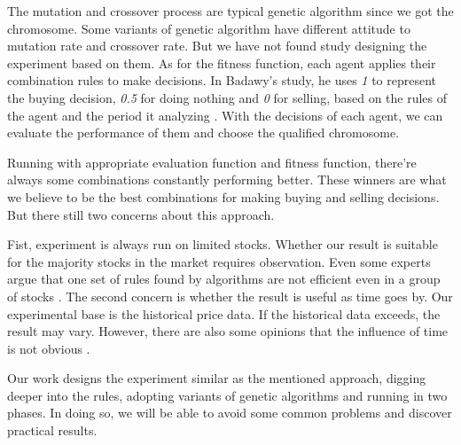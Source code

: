 \documentclass{article}
\begin{document}
The mutation and crossover process are typical genetic algorithm since we got the chromosome.
Some variants of genetic algorithm have different attitude to mutation rate and crossover rate.
But we have not found study designing the experiment based on them.
As for the fitness function, each agent applies their combination rules to make decisions.
In Badawy's study, he uses \emph{1} to represent the buying decision, \emph{0.5} for doing nothing and \emph{0} for selling,
based on the rules of the agent and the period it analyzing
\cite{genetic-algorithms-for-predicting-the-egyptian-stock-market}.
With the decisions of each agent, we can evaluate the performance of them and choose the qualified chromosome.

Running with appropriate evaluation function and fitness function,
there're always some combinations constantly performing better.
These winners are what we believe to be the best combinations for making buying and selling decisions.
But there still two concerns about this approach.

Fist, experiment is always run on limited stocks.
Whether our result is suitable for the majority stocks in the market requires observation.
Even some experts argue that one set of rules found by algorithms are not efficient even in a group of stocks
\cite{stock-timing-using-genetic-algorithms}.
The second concern is whether the result is useful as time goes by.
Our experimental base is the historical price data.
If the historical data exceeds, the result may vary.
However, there are also some opinions that the influence of time is not obvious
\cite{stock-timing-using-genetic-algorithms}.

Our work designs the experiment similar as the mentioned approach,
digging deeper into the rules, adopting variants of genetic algorithms and running in two phases.
In doing so, we will be able to avoid some common problems and discover practical results.






\end{document}
